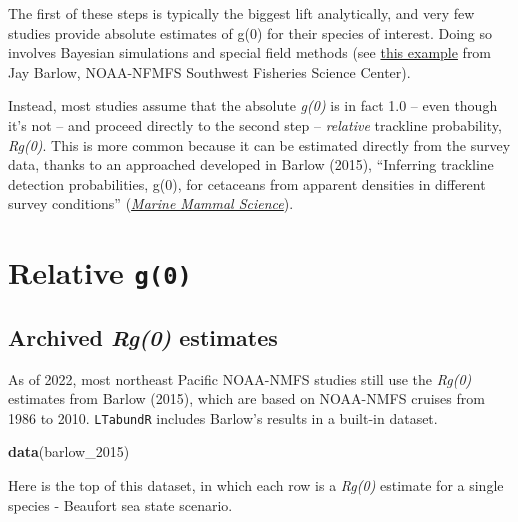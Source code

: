 \documentclass[
]{book}
\newenvironment{Shaded}{\begin{snugshade}}{\end{snugshade}}
\newcommand{\FunctionTok}[1]{\textcolor[rgb]{0.13,0.29,0.53}{\textbf{#1}}}
\newcommand{\NormalTok}[1]{#1}
\begin{document}
The first of these steps is typically the biggest lift analytically, and very few studies provide absolute estimates of g(0) for their species of interest. Doing so involves Bayesian simulations and special field methods (see \href{https://www.taylorfrancis.com/chapters/edit/10.1201/9781003211167-19/trackline-detection-probability-long-diving-whales-jay-barlow}{this example} from Jay Barlow, NOAA-NFMFS Southwest Fisheries Science Center).

Instead, most studies assume that the absolute \emph{g(0)} is in fact 1.0 -- even though it's not -- and proceed directly to the second step -- \emph{relative} trackline probability, \emph{Rg(0)}. This is more common because it can be estimated directly from the survey data, thanks to an approached developed in Barlow (2015), ``Inferring trackline detection probabilities, g(0), for cetaceans from apparent densities in different survey conditions'' (\href{https://onlinelibrary.wiley.com/doi/abs/10.1111/mms.12205?casa_token=BuVMa8KCgQUAAAAA:iXIQxWBCnMaWWNlNTSQ5EC2LYmodDYGHs0r-pgIPNxOCLRZzf8xXZ3vDUOlUCZRptmDsztr0Hh4}{\emph{Marine Mammal Science}}).

\hypertarget{relative-g0}{%
\section*{\texorpdfstring{Relative \texttt{g(0)}}{Relative g(0)}}\label{relative-g0}}

\hypertarget{archived-rg0-estimates}{%
\subsection*{\texorpdfstring{Archived \emph{Rg(0)} estimates}{Archived Rg(0) estimates}}\label{archived-rg0-estimates}}

As of 2022, most northeast Pacific NOAA-NMFS studies still use the \emph{Rg(0)} estimates from Barlow (2015), which are based on NOAA-NMFS cruises from 1986 to 2010. \texttt{LTabundR} includes Barlow's results in a built-in dataset.

\begin{Shaded}
\begin{Highlighting}[]
\FunctionTok{data}\NormalTok{(barlow\_2015)}
\end{Highlighting}
\end{Shaded}

Here is the top of this dataset, in which each row is a \emph{Rg(0)} estimate for a single species - Beaufort sea state scenario.
\end{document}
